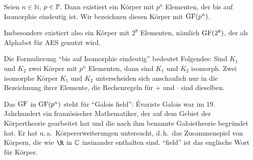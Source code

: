\begin{theorem}\label{thm:finiteFields}
 Seien $n \in ℕ$, $p \in \mathbb P$. Dann existiert ein Körper mit $p^n$ Elementen, der bis auf Isomorphie eindeutig ist. Wir bezeichnen diesen Körper mit $\operatorname{GF}(p^n)$.
\end{theorem}

Insbesondere existiert also ein Körper mit $2^8$ Elementen, nämlich $\operatorname{GF}(2^8)$, der als Alphabet für AES genutzt wird.

\begin{remark}
 Die Formulierung \enquote{bis auf Isomorphie eindeutig} bedeutet Folgendes: Sind $K_1$ und $K_2$ zwei Körper mit $p^n$ Elementen, dann sind $K_1$ und $K_2$ isomorph. Zwei isomorphe Körper $K_1$ und $K_2$ unterscheiden sich anschaulich nur in die Bezeichnung ihrer Elemente, die Rechenregeln für $+$ und $\cdot$ sind dieselben.
\end{remark}

\begin{remark}
Das $\operatorname{GF}$ in $\operatorname{GF}(p^n)$ steht für \enquote{Galois field}: Évariste Galois war im 19. Jahrhundert ein französischer Mathematiker, der auf dem Gebiet der Körpertheorie gearbeitet hat und die nach ihm benannte Galoistheorie begründet hat. Er hat u.\,a.~Körpererweiterungen untersucht, d.\,h.~das Zusammenspiel von Körpern, die wie $\R$ in $\mathbb C$ ineinander enthalten sind. \enquote{field} ist das englische Wort für Körper.
\end{remark}

